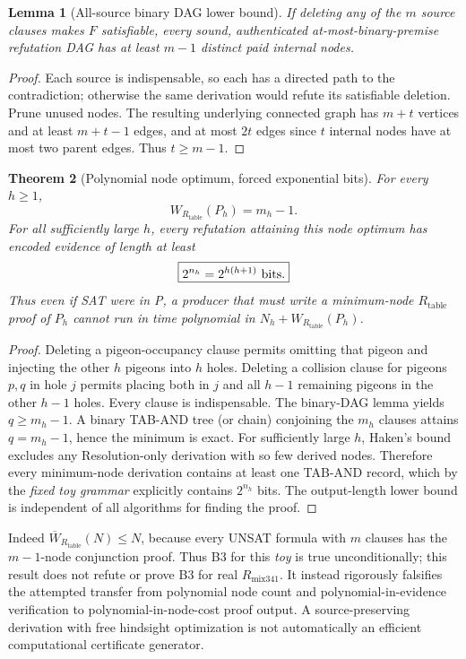 \documentclass[11pt]{article}
\newtheorem{theorem}{Theorem}
\newtheorem{lemma}[theorem]{Lemma}
\begin{document}
\begin{lemma}[All-source binary DAG lower bound]
If deleting any of the $m$ source clauses makes $F$ satisfiable,
every sound, authenticated at-most-binary-premise refutation DAG
has at least $m-1$ distinct paid internal nodes.
\end{lemma}
\begin{proof}
Each source is indispensable, so each has a directed path to
the contradiction; otherwise the same derivation would refute
its satisfiable deletion. Prune unused nodes. The resulting
underlying connected graph has $m+t$ vertices and at least
$m+t-1$ edges, and at most $2t$ edges since $t$ internal
nodes have at most two parent edges. Thus $t\ge m-1$.
\end{proof}
\begin{theorem}[Polynomial node optimum, forced exponential bits]
For every $h\ge1$,
\[
 \boxed{W_{R_{\mathrm{table}}}(P_h)=m_h-1.}
\]
For all sufficiently large $h$, every refutation attaining this
node optimum has encoded evidence of length at least
\[
 \boxed{2^{n_h}=2^{h(h+1)}\ {\rm bits}.}
\]
Thus even if SAT were in P, a producer that must \emph{write}
a minimum-node $R_{\mathrm{table}}$ proof of $P_h$ cannot run in
time polynomial in $N_h+W_{R_{\mathrm{table}}}(P_h)$.
\end{theorem}
\begin{proof}
Deleting a pigeon-occupancy clause permits omitting that
pigeon and injecting the other $h$ pigeons into $h$ holes.
Deleting a collision clause for pigeons $p,q$ in hole $j$
permits placing both in $j$ and all $h-1$ remaining pigeons
in the other $h-1$ holes. Every clause is indispensable.
The binary-DAG lemma yields $q\ge m_h-1$.
A binary TAB-AND tree (or chain) conjoining the $m_h$ clauses
attains $q=m_h-1$, hence the minimum is exact. For sufficiently
large $h$, Haken's bound excludes any Resolution-only derivation
with so few derived nodes. Therefore every minimum-node
derivation contains at least one TAB-AND record, which by the
\emph{fixed toy grammar} explicitly contains $2^{n_h}$ bits.
The output-length lower bound is independent of all algorithms
for finding the proof.
\end{proof}
Indeed $\overline W_{R_{\mathrm{table}}}(N)\le N$, because every
UNSAT formula with $m$ clauses has the $m-1$-node conjunction
proof. Thus B3 for this \emph{toy} is true unconditionally;
this result does not refute or prove B3 for real $R_{\mathrm{mix341}}$.
It instead rigorously falsifies the attempted transfer from
polynomial node count and polynomial-in-evidence verification
to polynomial-in-node-cost proof output. A source-preserving
derivation with free hindsight optimization is not automatically
an efficient computational certificate generator.
\end{document}
